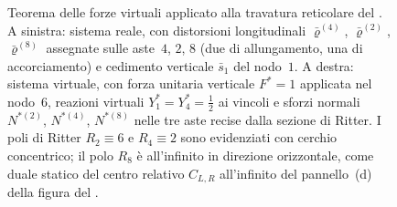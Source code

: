 \begin{figure}[htbp]
{%
			}
			\caption{Teorema delle forze virtuali applicato alla travatura
				reticolare del . A sinistra: sistema
				reale, con distorsioni longitudinali $\bar\varrho^{(4)}$, $\bar\varrho^{(2)}$,
				$\bar\varrho^{(8)}$ assegnate sulle aste~$4$, $2$, $8$ (due di
				allungamento, una di accorciamento) e cedimento verticale $\bar s_1$
				del nodo~$1$. A destra: sistema virtuale, con forza unitaria verticale
				$F^{*}=1$ applicata nel nodo~$6$, reazioni virtuali $Y_1^{*}=Y_4^{*}
				=\tfrac{1}{2}$ ai vincoli e sforzi normali $N^{*(2)}$, $N^{*(4)}$,
				$N^{*(8)}$ nelle tre aste recise dalla sezione di Ritter.
				I poli di Ritter $R_2\equiv 6$ e $R_4\equiv 2$ sono evidenziati con
				cerchio concentrico; il polo $R_8$ è all'infinito in direzione
				orizzontale, come duale statico del centro relativo $C_{L,R}$
				all'infinito del pannello~(d) della figura del
				.}
			\label{fig:TFV_reticolare}
		\end{figure}
